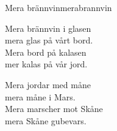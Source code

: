\begin{song}{Mera brännvin}{merabrannvin}
\begin{vers}
Mera brännvin i glasen\\
mera glas på vårt bord.\\
Mera bord på kalasen\\
mer kalas på vår jord.\\
\end{vers}
\begin{vers}
Mera jordar med måne\\
mera måne i Mars.\\
Mera marscher mot Skåne\\
mera Skåne gubevars.\\
\end{vers}
\end{song}
